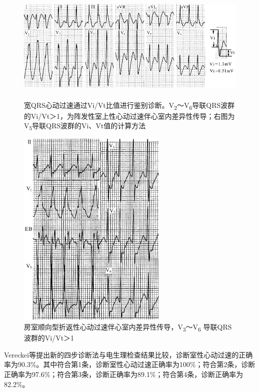 \begin{figure}[!htbp]
 \centering
 \includegraphics[width=5.5in,height=2.17708in]{./images/Image00514.jpg}
 \captionsetup{justification=centering}
 \caption{宽QRS心动过速通过Vi/Vt比值进行鉴别诊断。V\textsubscript{2}～V\textsubscript{6}导联QRS波群的Vi/Vt＞1，为阵发性室上性心动过速伴心室内差异性传导；右图为V\textsubscript{5}导联QRS波群的Vi、Vt值的计算方法}
 \label{fig31-11}
  \end{figure} 


\begin{figure}[!htbp]
 \centering
 \includegraphics[width=2.8125in,height=3.77083in]{./images/Image00515.jpg}
 \captionsetup{justification=centering}
 \caption{房室顺向型折返性心动过速伴心室内差异性传导，V\textsubscript{3}～V\textsubscript{6} 导联QRS波群的Vi/Vt＞1}
 \label{fig31-12}
  \end{figure} 


Vereckei等提出新的四步诊断法与电生理检查结果比较，诊断室性心动过速的正确率为90.3\%。其中符合第1条，诊断室性心动过速正确率为100\%；符合第2条，诊断正确率为97.6\%；符合第3条，诊断正确率为89.1\%；符合第4条，诊断正确率为82.2\%。

